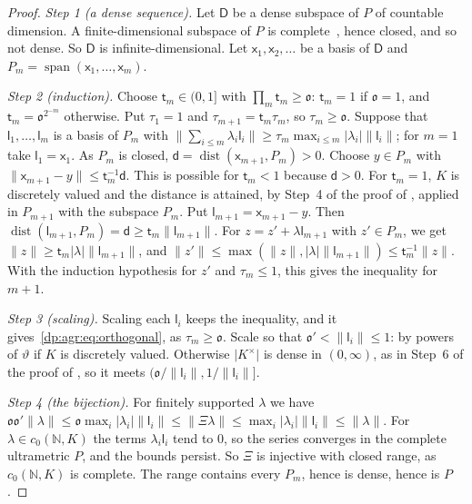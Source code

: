 \documentclass[11pt]{amsart}
\theoremstyle{definition}
\theoremstyle{remark}
\numberwithin{equation}{section}
\newcommand{\N}{\mathbb N}
\newcommand{\spn}{\operatorname{span}}
\newcommand{\abs}[1]{\lvert #1\rvert}
\newcommand{\norm}[1]{\lVert #1\rVert}
\theoremstyle{plain}
\theoremstyle{definition}
\theoremstyle{plain}
\begin{document}
\begin{proof}
\emph{Step 1 (a dense sequence).} Let $\mathsf D$ be a dense subspace of $P$ of countable dimension. A finite-dimensional subspace of $P$ is complete~\cite[Lemma~A.3]{I}, hence closed, and so not dense. So $\mathsf D$ is infinite-dimensional. Let $\mathsf x_1,\mathsf x_2,\dots$ be a basis of $\mathsf D$ and $P_m=\spn(\mathsf x_1,\dots,\mathsf x_m)$.

\emph{Step 2 (induction).} Choose $\mathsf t_m\in(0,1]$ with $\prod_m\mathsf t_m\ge\mathfrak o$: $\mathsf t_m=1$ if $\mathfrak o=1$, and $\mathsf t_m=\mathfrak o^{2^{-m}}$ otherwise. Put $\tau_1=1$ and $\tau_{m+1}=\mathsf t_m\tau_m$, so $\tau_m\ge\mathfrak o$. Suppose that $\mathsf l_1,\dots,\mathsf l_m$ is a basis of $P_m$ with $\norm{\sum_{i\le m}\lambda_i\mathsf l_i}\ge\tau_m\max_{i\le m}\abs{\lambda_i}\norm{\mathsf l_i}$; for $m=1$ take $\mathsf l_1=\mathsf x_1$. As $P_m$ is closed, $\mathsf d=\operatorname{dist}(\mathsf x_{m+1},P_m)>0$. Choose $y\in P_m$ with $\norm{\mathsf x_{m+1}-y}\le\mathsf t_m^{-1}\mathsf d$. This is possible for $\mathsf t_m<1$ because $\mathsf d>0$. For $\mathsf t_m=1$, $K$ is discretely valued and the distance is attained, by Step~4 of the proof of \cite[Lemma~Q.13]{I}, applied in $P_{m+1}$ with the subspace $P_m$. Put $\mathsf l_{m+1}=\mathsf x_{m+1}-y$. Then $\operatorname{dist}(\mathsf l_{m+1},P_m)=\mathsf d\ge\mathsf t_m\norm{\mathsf l_{m+1}}$. For $z=z'+\lambda\mathsf l_{m+1}$ with $z'\in P_m$, we get $\norm z\ge\mathsf t_m\abs\lambda\norm{\mathsf l_{m+1}}$, and $\norm{z'}\le\max(\norm z,\abs\lambda\norm{\mathsf l_{m+1}})\le\mathsf t_m^{-1}\norm z$. With the induction hypothesis for $z'$ and $\tau_m\le1$, this gives the inequality for $m+1$.

\emph{Step 3 (scaling).} Scaling each $\mathsf l_i$ keeps the inequality, and it gives~\eqref{dp:agr:eq:orthogonal}, as $\tau_m\ge\mathfrak o$. Scale so that $\mathfrak o'<\norm{\mathsf l_i}\le1$: by powers of $\vartheta$ if $K$ is discretely valued. Otherwise $\abs{K^\times}$ is dense in $(0,\infty)$, as in Step~6 of the proof of \cite[Lemma~Q.13]{I}, so it meets $(\mathfrak o/\norm{\mathsf l_i},1/\norm{\mathsf l_i}]$.

\emph{Step 4 (the bijection).} For finitely supported $\lambda$ we have $\mathfrak o\mathfrak o'\norm\lambda\le\mathfrak o\max_i\abs{\lambda_i}\norm{\mathsf l_i}\le\norm{\Xi\lambda}\le\max_i\abs{\lambda_i}\norm{\mathsf l_i}\le\norm\lambda$. For $\lambda\in c_0(\N,K)$ the terms $\lambda_i\mathsf l_i$ tend to $0$, so the series converges in the complete ultrametric $P$, and the bounds persist. So $\Xi$ is injective with closed range, as $c_0(\N,K)$ is complete. The range contains every $P_m$, hence is dense, hence is $P$.
\end{proof}
\end{document}
